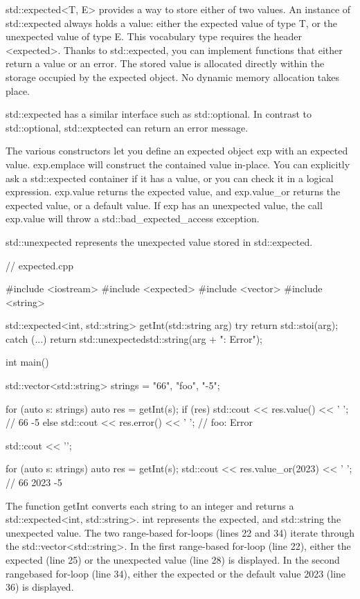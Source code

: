 std::expected<T, E> provides a way to store either of two values. An instance of std::expected always holds a value: either the expected value of type T, or the unexpected value of type E. This vocabulary type requires the header <expected>. Thanks to std::expected, you can implement functions that either return a value or an error. The stored value is allocated directly within the storage occupied by the expected object. No dynamic memory allocation takes place.

std::expected has a similar interface such as std::optional. In contrast to std::optional, std::exptected can return an error message.

The various constructors let you define an expected object exp with an expected value. exp.emplace will construct the contained value in-place. You can explicitly ask a std::expected container if it has a value, or you can check it in a logical expression. exp.value returns the expected value, and exp.value\_or returns the expected value, or a default value. If exp has an unexpected value, the call exp.value will throw a std::bad\_expected\_access exception.

std::unexpected represents the unexpected value stored in std::expected.


\begin{cpp}
// expected.cpp

#include <iostream>
#include <expected>
#include <vector>
#include <string>

std::expected<int, std::string> getInt(std::string arg) {
	try {
		return std::stoi(arg);
	}
	catch (...) {
		return std::unexpected{std::string(arg + ": Error")};
	}
}

int main() {

	std::vector<std::string> strings = {"66", "foo", "-5"};
	
	for (auto s: strings) {
		auto res = getInt(s);
		if (res) {
			std::cout << res.value() << ' '; // 66 -5
		}
		else {
			std::cout << res.error() << ' '; // foo: Error
		}
	}
	
	std::cout << '\n';
	
	for (auto s: strings) {
		auto res = getInt(s);
		std::cout << res.value_or(2023) << ' '; // 66 2023 -5
	}

}
\end{cpp}

The function getInt converts each string to an integer and returns a std::expected<int, std::string>. int represents the expected, and std::string the unexpected value. The two range-based for-loops (lines 22 and 34) iterate through the std::vector<std::string>. In the first range-based for-loop (line 22), either the expected (line 25) or the unexpected value (line 28) is displayed. In the second rangebased for-loop (line 34), either the expected or the default value 2023 (line 36) is displayed.


